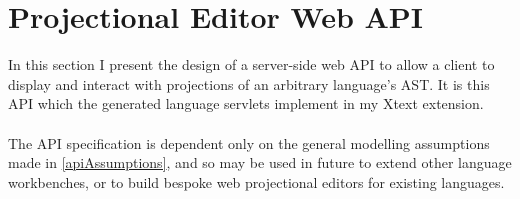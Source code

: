 \documentclass{article}
\begin{document}
\section{Projectional Editor Web API}\label{api}
In this section I present the design of a server-side web API to allow a client to display and interact with projections of an arbitrary language's AST. It is this API which the generated language servlets implement in my Xtext extension. 
\\
\\
The API specification is dependent only on the general modelling assumptions made in \ref{apiAssumptions}, and so may be used in future to extend other language workbenches, or to build bespoke web projectional editors for existing languages.
\end{document}
